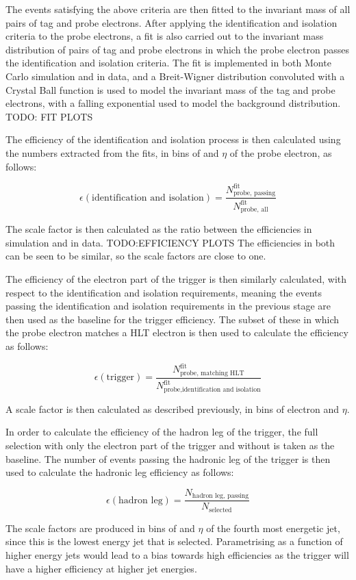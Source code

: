 The events satisfying the above criteria are then fitted to the invariant mass of all pairs of tag and probe
electrons. After applying the identification and isolation criteria to the probe electrons, a fit is also
carried out to the invariant mass distribution of pairs of tag and probe electrons in which the probe electron
passes the identification and isolation criteria. The fit is implemented in both Monte Carlo simulation
and in data, and a Breit-Wigner distribution convoluted with a Crystal Ball function is used to model the
invariant mass of the tag and probe electrons, with a falling exponential used to model the background distribution.
TODO: FIT PLOTS %

The efficiency of the identification and isolation process is then calculated using the numbers extracted
from the fits, in bins of \pt and $\eta$ of the probe electron, as follows:

\begin{equation}
\epsilon(\text{identification and isolation}) = \frac{N^{\text{fit}}_{\text{probe, passing}}}{N^{\text{fit}}_{\text{probe, all}}}
\end{equation}

The scale factor is then calculated as the ratio between the efficiencies in simulation and in data.
TODO:EFFICIENCY PLOTS %
The efficiencies in both can be seen to be similar, so the scale factors are close to one.

The efficiency of the electron part of the trigger is then similarly calculated, with respect to the
identification and isolation requirements, meaning the events passing the identification and isolation
requirements in the previous stage are then used as the baseline for the trigger efficiency. The subset of
these in which the probe electron matches a HLT electron is then used to calculate the efficiency as follows:

\begin{equation}
\epsilon(\text{trigger}) = \frac{N^{\text{fit}}_{\text{probe, matching HLT}}}{N^{\text{fit}}_{\text{probe,identification and isolation}}}
\end{equation}

A scale factor is then calculated as described previously, in bins of electron \pt and $\eta$.

In order to calculate the efficiency of the hadron leg of the trigger, the full selection with only the
electron part of the trigger and without \btagging is taken as the baseline. The number of events passing the
hadronic leg of the trigger is then used to calculate the hadronic leg efficiency as follows:

\begin{equation}
\epsilon(\text{hadron leg}) = \frac{N_{\text{hadron leg, passing}}}{N_{\text{selected}}}
\end{equation}

The scale factors are produced in bins of \pt and $\eta$ of the fourth most energetic jet, since this is the
lowest energy jet that is selected. Parametrising as a function of higher energy jets would lead to a bias
towards high efficiencies as the trigger will have a higher efficiency at higher jet energies.
